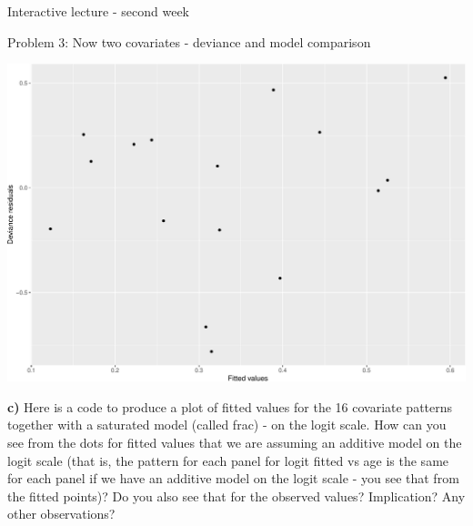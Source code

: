 \documentclass[
  ignorenonframetext,
]{beamer}
\newenvironment{Shaded}{\begin{snugshade}}{\end{snugshade}}
\newcommand{\AttributeTok}[1]{\textcolor[rgb]{0.13,0.29,0.53}{#1}}
\newcommand{\FunctionTok}[1]{\textcolor[rgb]{0.13,0.29,0.53}{\textbf{#1}}}
\newcommand{\NormalTok}[1]{#1}
\newcommand{\OtherTok}[1]{\textcolor[rgb]{0.56,0.35,0.01}{#1}}
\newcommand{\SpecialCharTok}[1]{\textcolor[rgb]{0.81,0.36,0.00}{\textbf{#1}}}
\newcommand{\StringTok}[1]{\textcolor[rgb]{0.31,0.60,0.02}{#1}}
\begin{document}
\begin{frame}[fragile]{Interactive lecture - second week}
\begin{block}{Problem 3: Now two covariates - deviance and model
comparison}
\begin{Shaded}
\end{Shaded}

\includegraphics{3BinRegPresentation_files/figure-beamer/unnamed-chunk-47-1.pdf}

\textbf{c)} Here is a code to produce a plot of fitted values for the 16
covariate patterns together with a saturated model (called frac) - on
the logit scale. How can you see from the dots for fitted values that we
are assuming an additive model on the logit scale (that is, the pattern
for each panel for logit fitted vs age is the same for each panel if we
have an additive model on the logit scale - you see that from the fitted
points)? Do you also see that for the observed values? Implication? Any
other observations?


\end{block}
\end{frame}
\end{document}
